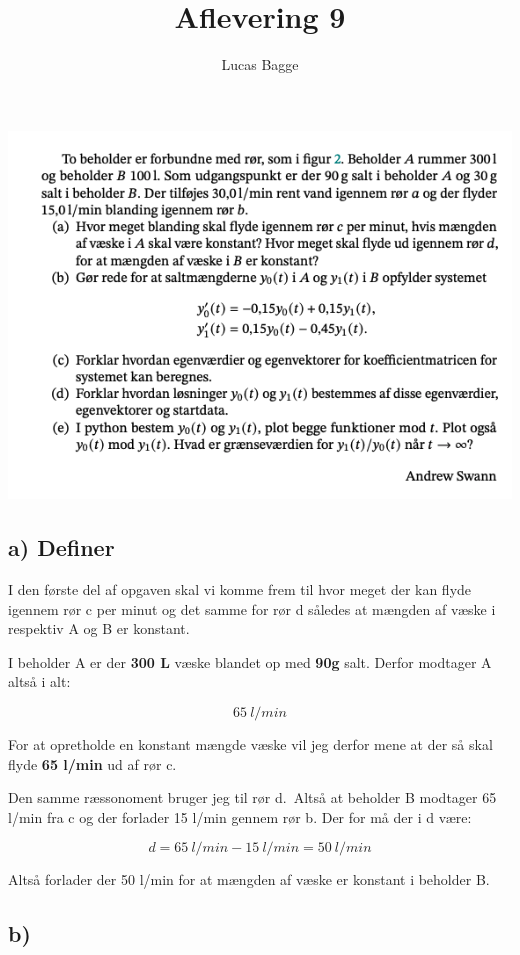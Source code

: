 \documentclass[
]{article}
\title{Aflevering 9}
\subtitle{Lucas Bagge}
\author{}
\date{\vspace{-2.5em}}
\begin{document}
\maketitle

\includegraphics{na-alf-9.png}

\hypertarget{a-definer}{%
\subsection{a) Definer}\label{a-definer}}

I den første del af opgaven skal vi komme frem til hvor meget der kan
flyde igennem rør c per minut og det samme for rør d således at mængden
af væske i respektiv A og B er konstant.

I beholder A er der \textbf{300 L} væske blandet op med \textbf{90g}
salt. Derfor modtager A altså i alt:

\[
65 \ l/min
\]

For at opretholde en konstant mængde væske vil jeg derfor mene at der så
skal flyde \textbf{65 l/min} ud af rør c.~

Den samme ræssonoment bruger jeg til rør d.~Altså at beholder B modtager
65 l/min fra c og der forlader 15 l/min gennem rør b. Der for må der i d
være:

\[
d=65 \ l/min - 15 \ l/min=50 \ l/min
\]

Altså forlader der 50 l/min for at mængden af væske er konstant i
beholder B.

\hypertarget{b}{%
\subsection{b)}\label{b}}
\end{document}
